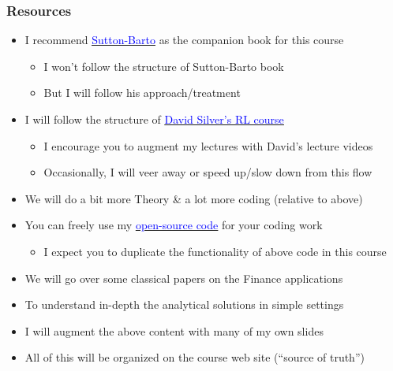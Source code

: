 \documentclass[handout]{beamer}
\begin{document}
\begin{frame}
\frametitle{Resources}
\pause
\begin{itemize}[<+->]
\item I recommend \href{http://incompleteideas.net/book/the-book-2nd.html}{\underline{\textcolor{blue}{Sutton-Barto}}} as the companion book for this course
\begin{itemize}
\item I won't follow the structure of Sutton-Barto book
\item But I will follow his approach/treatment
\end{itemize}
\item I will follow the structure of \href{http://www0.cs.ucl.ac.uk/staff/d.silver/web/Teaching.html}{\underline{\textcolor{blue}{David Silver's RL course}}}
\begin{itemize}
\item I encourage you to augment my lectures with David's lecture videos
\item Occasionally, I will veer away or speed up/slow down from this flow
\end{itemize}
\item We will do a bit more Theory \& a lot more coding (relative to above)
\item You can freely use my \href{https://github.com/coverdrive/MDP-DP-RL}{\underline{\textcolor{blue}{open-source code}}} for your coding work
\begin{itemize}
\item I expect you to duplicate the functionality of above code in this course
\end{itemize}
\item We will go over some classical papers on the Finance applications
\item To understand in-depth the analytical solutions in simple settings
\item I will augment the above content with many of my own slides
\item All of this will be organized on the course web site (``source of truth'')
\end{itemize}
\end{frame}
\end{document}
